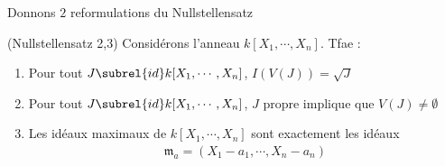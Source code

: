             Donnons $2$ reformulations du Nullstellensatz
            \begin{prop} (Nullstellensatz 2,3)
                Considérons l'anneau $k[X_1, \cdots, X_n]$. Tfae :
                \begin{enumerate}
                    \item \label{null_1} Pour tout $J \subrel{id} k[X_1, \cdots, X_n]$, $I(V(J)) = \sqrt{J}$
                    \item \label{null_2} Pour tout $J \subrel{id} k[X_1, \cdots, X_n]$, $J$ propre implique que $V(J) \neq \emptyset$
                    \item \label{null_3} Les idéaux maximaux de $k[X_1, \cdots, X_n]$ sont exactement les idéaux
                    \begin{align*}
                        \mathfrak{m}_a = (X_1 - a_1, \cdots, X_n - a_n)
                    \end{align*}
                \end{enumerate}
            \end{prop}
